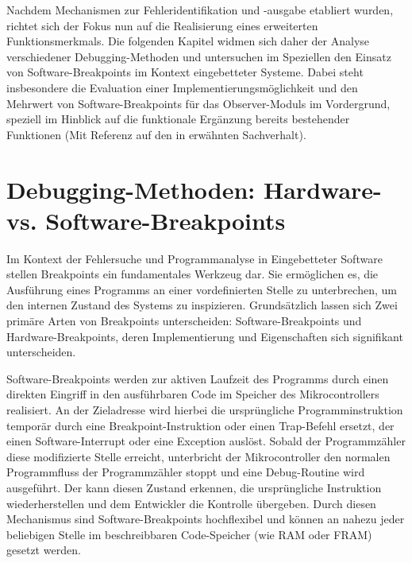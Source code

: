Nachdem Mechanismen zur Fehleridentifikation und -ausgabe etabliert wurden, richtet sich der Fokus nun auf die Realisierung eines erweiterten Funktionsmerkmals. Die folgenden Kapitel widmen sich daher der Analyse verschiedener Debugging-Methoden und untersuchen im Speziellen den Einsatz von Software-Breakpoints im Kontext eingebetteter Systeme. Dabei steht insbesondere die Evaluation einer Implementierungsm\"oglichkeit und den Mehrwert von Software-Breakpoints f\"ur das Observer-Moduls im Vordergrund, speziell im Hinblick auf die funktionale Erg\"anzung bereits bestehender Funktionen (Mit Referenz auf den in  erw\"ahnten Sachverhalt).\AI


\newpage
\section{Debugging-Methoden: Hardware- vs. Software-Breakpoints}
\label{sec:Hardware_VS_Software_Breakpoints}

Im Kontext der Fehlersuche und Programmanalyse in Eingebetteter Software stellen Breakpoints ein fundamentales Werkzeug dar. Sie erm\"oglichen es, die Ausf\"uhrung eines Programms an einer vordefinierten Stelle zu unterbrechen, um den internen Zustand des Systems zu inspizieren. Grunds\"atzlich lassen sich Zwei prim\"are Arten von Breakpoints unterscheiden: Software-Breakpoints und Hardware-Breakpoints, deren Implementierung und Eigenschaften sich signifikant unterscheiden.

Software-Breakpoints werden zur aktiven Laufzeit des Programms durch einen direkten Eingriff in den ausf\"uhrbaren Code im Speicher des Mikrocontrollers realisiert. An der Zieladresse wird hierbei die urspr\"ungliche Programminstruktion tempor\"ar durch eine Breakpoint-Instruktion oder einen Trap-Befehl ersetzt, der einen Software-Interrupt oder eine Exception ausl\"ost. Sobald der Programmz\"ahler diese modifizierte Stelle erreicht, unterbricht der Mikrocontroller den normalen Programmfluss der Programmz\"ahler stoppt und eine Debug-Routine wird ausgef\"uhrt. Der  kann diesen Zustand erkennen, die urspr\"ungliche Instruktion wiederherstellen und dem Entwickler die Kontrolle \"ubergeben. Durch diesen Mechanismus sind Software-Breakpoints hochflexibel und k\"onnen an nahezu jeder beliebigen Stelle im beschreibbaren Code-Speicher (wie RAM oder FRAM) gesetzt werden.

